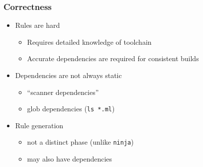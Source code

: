 \documentclass{beamer}
\begin{document}


 

\begin{frame}[fragile]
\frametitle{Correctness}
\begin{itemize}

\item Rules are hard
\begin{itemize}
\item Requires detailed knowledge of toolchain
\item Accurate dependencies are required for consistent builds
\end{itemize}

\item Dependencies are not always static
\begin{itemize}
\item ``scanner dependencies''
\item glob dependencies ({\tt ls *.ml})
\end{itemize}

\item Rule generation
\begin{itemize}
\item not a distinct phase (unlike {\tt ninja})
\item may also have dependencies
\end{itemize}

\end{itemize}
\end{frame}


\end{document}
